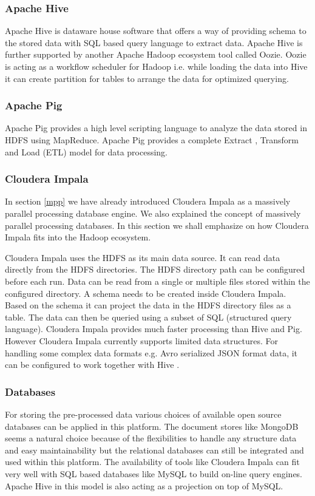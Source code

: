 \subsubsection{Apache Hive}
Apache Hive \cite{hive} is dataware house software that offers a way of providing schema to the stored data with SQL based query language to extract data. Apache Hive is further supported by another Apache Hadoop ecosystem tool called Oozie. Oozie is acting as a workflow scheduler for Hadoop i.e. while loading the data into Hive it can create partition for tables to arrange the data for optimized querying.
\subsubsection{Apache Pig}
Apache Pig \cite{pig}  provides a high level scripting language to analyze the data stored in HDFS using MapReduce. Apache Pig provides a complete Extract , Transform and Load (ETL) model for data processing.
\subsubsection{Cloudera Impala}
In section \ref{mpp} we have already introduced Cloudera Impala as a massively parallel processing database engine. We also  explained the concept of massively parallel processing databases. In this section we shall emphasize on how Cloudera Impala fits into the Hadoop ecosystem.
 
Cloudera Impala uses the HDFS as its main data source. It can read data directly from the HDFS directories. The HDFS directory path can be configured before each run. Data can be read from a single or multiple files stored within the configured directory. A schema needs to be created inside Cloudera Impala. Based on the schema it can project the data in the HDFS directory files as a table. The data can then be queried using a subset of SQL (structured query language). Cloudera Impala provides much faster processing than Hive and Pig. However Cloudera Impala currently supports limited data structures. For handling some complex data formats e.g. Avro serialized JSON format data, it can be configured to work together with Hive \cite{cimpala}. 

\subsubsection{Databases}
For storing the pre-processed data various choices of available open source databases can be applied in this platform. The document stores like MongoDB seems a natural choice because of the flexibilities to handle any structure data and easy maintainability but the relational databases can still be integrated and used within this platform. The availability of tools like Cloudera Impala can fit very well with SQL based databases like MySQL to build on-line query engines. Apache Hive in this model is also acting as a projection on top of MySQL.

